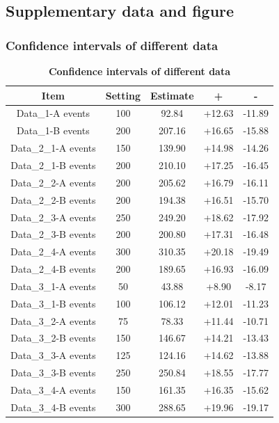 \documentclass[12pt,a4paper,UTF8]{article}
\begin{document}
    \subsection{Supplementary data and figure}
        \subsubsection{Confidence intervals of different data}
        \begin{table}[htbp]
                \centering
                    \begin{tabular}{ccccc}
                        \toprule
                        Item &Setting & Estimate & + & - \\
                        \midrule
                        Data\_1-A events &100   & 92.84 & +12.63 & -11.89 \\
                        Data\_1-B events &200   & 207.16 & +16.65 & -15.88 \\
                        Data\_2\_1-A events &150    & 139.90 & +14.98 & -14.26 \\
                        Data\_2\_1-B events &200    & 210.10 & +17.25 & -16.45 \\
                        Data\_2\_2-A events &200    & 205.62 & +16.79 & -16.11 \\
                        Data\_2\_2-B events &200    & 194.38 & +16.51 & -15.70 \\
                        Data\_2\_3-A events &250    & 249.20 & +18.62 & -17.92 \\
                        Data\_2\_3-B events &200    & 200.80 & +17.31 & -16.48 \\
                        Data\_2\_4-A events &300    & 310.35 & +20.18 & -19.49 \\
                        Data\_2\_4-B events &200    & 189.65 & +16.93 & -16.09 \\
                        Data\_3\_1-A events &50    & 43.88 & +8.90 & -8.17 \\
                        Data\_3\_1-B events &100    & 106.12 & +12.01 & -11.23 \\
                        Data\_3\_2-A events &75    & 78.33 & +11.44 & -10.71 \\
                        Data\_3\_2-B events &150    & 146.67 & +14.21 & -13.43 \\
                        Data\_3\_3-A events &125    & 124.16 & +14.62 & -13.88 \\
                        Data\_3\_3-B events &250    & 250.84 & +18.55 & -17.77 \\
                        Data\_3\_4-A events &150    & 161.35 & +16.35 & -15.62 \\
                        Data\_3\_4-B events &300    & 288.65 & +19.96 & -19.17 \\
                        \bottomrule
                    \end{tabular}
                    \caption{\textbf{Confidence intervals of different data}}
                    \label{tab:3.2}
        \end{table}	
        
\end{document}
